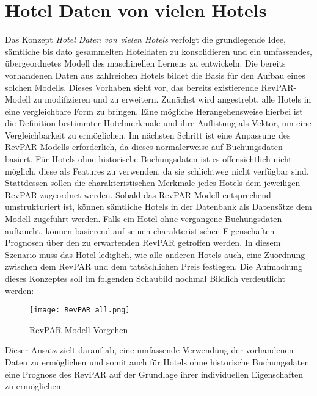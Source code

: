 \section{Hotel Daten von vielen Hotels}
\label{sec:all_Hotels}
Das Konzept \emph{Hotel Daten von vielen Hotels} verfolgt die grundlegende Idee, sämtliche bis dato gesammelten Hoteldaten zu konsolidieren und ein umfassendes, übergeordnetes Modell des maschinellen Lernens zu entwickeln.
\newline
\newline
Die bereits vorhandenen Daten aus zahlreichen Hotels bildet die Basis für den Aufbau eines solchen Modells. Dieses Vorhaben sieht vor, das bereits existierende RevPAR-Modell zu modifizieren und zu erweitern. Zunächst wird angestrebt, alle Hotels in eine vergleichbare Form zu bringen. Eine mögliche Herangehensweise hierbei ist die Definition bestimmter Hotelmerkmale und ihre Auflistung als Vektor, um eine Vergleichbarkeit zu ermöglichen.
\newline
\newline
Im nächsten Schritt ist eine Anpassung des RevPAR-Modells erforderlich, da dieses normalerweise auf Buchungsdaten basiert. Für Hotels ohne historische Buchungsdaten ist es offensichtlich nicht möglich, diese als Features zu verwenden, da sie schlichtweg nicht verfügbar sind. Stattdessen sollen die charakteristischen Merkmale jedes Hotels dem jeweiligen RevPAR zugeordnet werden.
\newline
\newline
Sobald das RevPAR-Modell entsprechend umstrukturiert ist, können sämtliche Hotels in der Datenbank als Datensätze dem Modell zugeführt werden. Falls ein Hotel ohne vergangene Buchungsdaten auftaucht, können basierend auf seinen charakteristischen Eigenschaften Prognosen über den zu erwartenden RevPAR getroffen werden. In diesem Szenario muss das Hotel lediglich, wie alle anderen Hotels auch, eine Zuordnung zwischen dem RevPAR und dem tatsächlichen Preis festlegen.
\newline
\newline
Die Aufmachung dieses Konzeptes soll im folgenden Schaubild nochmal Bildlich verdeutlicht werden:
\begin{figure}[h]
    \centering
    \texttt{[image: RevPAR\_all.png]}
    \caption[RevPAR-Modell Vorgehen]{RevPAR-Modell Vorgehen}
    \label{img:all_hotels}
\end{figure}

Dieser Ansatz zielt darauf ab, eine umfassende Verwendung der vorhandenen Daten zu ermöglichen und somit auch für Hotels ohne historische Buchungsdaten eine Prognose des RevPAR auf der Grundlage ihrer individuellen Eigenschaften zu ermöglichen.